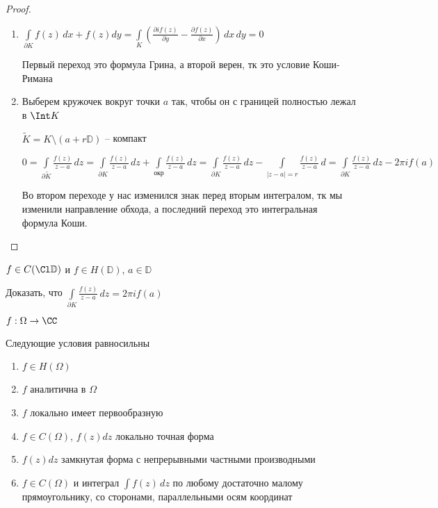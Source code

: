 \begin{proof}\thmslashn
		
	\begin{enumerate}
		\item 
		$\int\limits_{\partial K} f(z)\,dx + f(z)dy = \int\limits_{K}\left( \frac{\partial if(z)}{\partial y} - \frac{\partial f(z)}{\partial x} \right)\,dx\,dy = 0$
		
		Первый переход это формула Грина, а второй верен, тк это условие Коши-Римана 
		
		\item
		Выберем кружочек вокруг точки $a$ так, чтобы он с границей полностью лежал в $\Int K$
		
		$\tilde{K} = K \setminus(a + r\mathbb{D})$ -- компакт
		
		$0 = \int\limits_{\partial \tilde{K}} \frac{f(z)}{z-a}\,dz = \int\limits_{\partial K} \frac{f(z)}{z-a}\,dz + \int\limits_{\text{окр}} \frac{f(z)}{z-a}\,dz =  \int\limits_{\partial K} \frac{f(z)}{z-a}\,dz - \int\limits_{|z-a| = r} \frac{f(z)}{z-a}\,d = \int\limits_{\partial K} \frac{f(z)}{z-a}\,dz - 2\pi i f(a)$
		
		Во втором переходе у нас изменился знак перед вторым интегралом, тк мы изменили направление обхода, а последний переход это интегральная формула Коши.
	\end{enumerate}
	
\end{proof}

\begin{exerc}
	$f\in C(\Cl \mathbb{D})$ и $f \in H(\mathbb{D})$, $a \in \mathbb{D}$
	
	Доказать, что $\int\limits_{\partial K} \frac{f(z)}{z-a}\,dz = 2\pi i f(a)$
\end{exerc}

\begin{theorem}\thmslashn
	
	$f:\Omega \to \CC$ 
	
	Следующие условия равносильны
	
	\begin{enumerate}[1)]
		\item 
		$f\in H(\Omega)$
		\item
		$f$ аналитична в $\Omega$
		\item
		$f$ локально имеет первообразную
		\item
		$f \in C(\Omega)$, $f(z)dz$ локально точная форма
		\item
		$f(z)dz$ замкнутая форма с непрерывными частными производными 
		\item
		$f\in C(\Omega)$ и интеграл $\int f(z)\,dz$ по любому достаточно малому прямоугольнику, со сторонами, параллельными осям координат
		 
	\end{enumerate}
	
\end{theorem}

